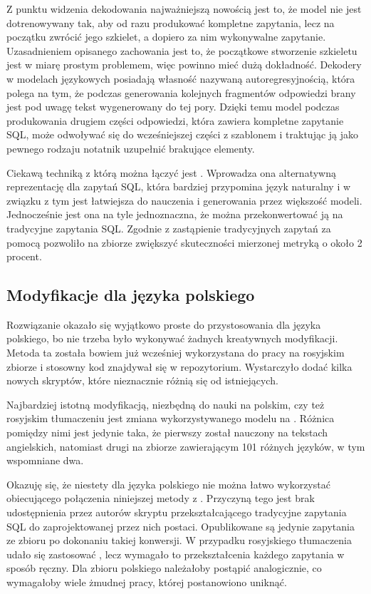 Z punktu widzenia dekodowania najważniejszą nowością jest to, że model  nie jest dotrenowywany tak, aby od razu produkować kompletne zapytania, lecz na początku zwrócić jego szkielet, a dopiero za nim wykonywalne zapytanie. Uzasadnieniem opisanego zachowania jest to, że początkowe stworzenie szkieletu jest w miarę prostym problemem, więc powinno mieć dużą dokładność. Dekodery w modelach językowych posiadają własność nazywaną autoregresyjnością, która polega na tym, że podczas generowania kolejnych fragmentów odpowiedzi brany jest pod uwagę tekst wygenerowany do tej pory. Dzięki temu model  podczas produkowania drugiem części odpowiedzi, która zawiera kompletne zapytanie SQL, może odwoływać się do wcześniejszej części z szablonem i traktując ją jako pewnego rodzaju notatnik uzupełnić brakujące elementy.

Ciekawą techniką z którą  można łączyć jest  \cite{Gan2021natsql}. Wprowadza ona alternatywną reprezentację dla zapytań SQL, która bardziej przypomina język naturalny i w związku z tym jest łatwiejsza do nauczenia i generowania przez większość modeli. Jednocześnie jest ona na tyle jednoznaczna, że można przekonwertować ją na tradycyjne zapytania SQL. Zgodnie z \cite{Li2023resdsql} zastąpienie tradycyjnych zapytań za pomocą  pozwoliło na zbiorze  zwiększyć skuteczności mierzonej metryką  o około 2 procent.

\subsection{Modyfikacje dla języka polskiego}
Rozwiązanie  okazało się wyjątkowo proste do przystosowania dla języka polskiego, bo nie trzeba było wykonywać żadnych kreatywnych modyfikacji. Metoda ta została bowiem już wcześniej wykorzystana do pracy na rosyjskim zbiorze  i stosowny kod znajdywał się w repozytorium. Wystarczyło dodać kilka nowych skryptów, które nieznacznie różnią się od istniejących.

Najbardziej istotną modyfikacją, niezbędną do nauki na polskim, czy też rosyjskim tłumaczeniu jest zmiana wykorzystywanego modelu  na  \cite{Xue2020}. Różnica pomiędzy nimi jest jedynie taka, że pierwszy został nauczony na tekstach angielskich, natomiast drugi na zbiorze zawierającym 101 różnych języków, w tym wspomniane dwa.

Okazuję się, że niestety dla języka polskiego nie można łatwo wykorzystać obiecującego połączenia niniejszej metody z . Przyczyną tego jest brak udostępnienia przez autorów  skryptu przekształcającego tradycyjne zapytania SQL do zaprojektowanej przez nich postaci. Opublikowane są jedynie zapytania ze zbioru  po dokonaniu takiej konwersji. W przypadku rosyjskiego tłumaczenia udało się zastosować , lecz wymagało to przekształcenia każdego zapytania w sposób ręczny. Dla zbioru polskiego należałoby postąpić analogicznie, co wymagałoby wiele żmudnej pracy, której postanowiono uniknąć.

